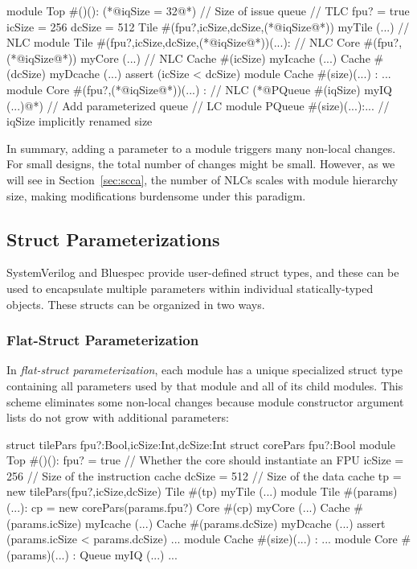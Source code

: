 \begin{phdl}
module Top #()():
  (*@\textcolor[rgb]{1,0,0}{iqSize = 32}@*)  // Size of issue queue                            // TLC
  fpu? = true
  icSize = 256 
  dcSize = 512
  Tile #(fpu?,icSize,dcSize,(*@\textcolor[rgb]{1,0,0}{iqSize}@*)) myTile (...)                 // NLC
module Tile #(fpu?,icSize,dcSize,(*@\textcolor[rgb]{1,0,0}{iqSize}@*))(...):                   // NLC
  Core #(fpu?,(*@\textcolor[rgb]{1,0,0}{iqSize}@*)) myCore (...)                               // NLC
  Cache #(icSize) myIcache (...)
  Cache #(dcSize) myDcache (...)
  assert (icSize < dcSize)
module Cache #(size)(...) : ... 
module Core #(fpu?,(*@\textcolor[rgb]{1,0,0}{iqSize}@*))(...) :                                // NLC
  (*@\textcolor[rgb]{1,0,0}{PQueue \#(iqSize) myIQ (...)}@*)  // Add parameterized queue        // LC
module PQueue #(size)(...):... // iqSize implicitly renamed size
\end{phdl}

In summary, adding a parameter to a module triggers many non-local changes. For small designs, the total number of changes might be small. However, as we will see in Section~\ref{sec:scca}, the number of NLCs scales with module hierarchy size, making modifications burdensome under this paradigm.

\subsection{Struct Parameterizations}

SystemVerilog and Bluespec provide user-defined struct types, and these can be used to encapsulate multiple parameters within individual statically-typed objects. These structs can be organized in two ways.

\subsubsection{Flat-Struct Parameterization}

In \emph{flat-struct parameterization}, each module has a unique specialized struct type containing all parameters used by that module and all of its child modules. This scheme eliminates some non-local changes because module constructor argument lists do not grow with additional parameters:

\begin{phdl}
struct tilePars {fpu?:Bool,icSize:Int,dcSize:Int}
struct corePars {fpu?:Bool}
module Top #()():
  fpu? = true    // Whether the core should instantiate an FPU
  icSize = 256   // Size of the instruction cache
  dcSize = 512   // Size of the data cache
  tp = new tilePars(fpu?,icSize,dcSize)
  Tile #(tp) myTile (...)
module Tile #(params)(...):
  cp = new corePars(params.fpu?)
  Core  #(cp) myCore (...)
  Cache #(params.icSize) myIcache (...)
  Cache #(params.dcSize) myDcache (...)
  assert (params.icSize < params.dcSize) ...
module Cache #(size)(...) : ...
module Core #(params)(...) :
  Queue myIQ (...) ...
\end{phdl} 

